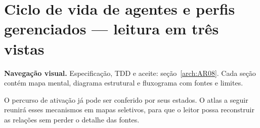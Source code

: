 \clearpage\section{Ciclo de vida de agentes e perfis gerenciados — leitura em três vistas}\label{arch:AR05}




\begin{descricao}\textbf{Navegação visual.} Especificação, TDD e aceite: seção~\ref{arch:AR08}. Cada seção contém mapa mental, diagrama estrutural e fluxograma com fontes e limites.\end{descricao}


O percurso de ativação já pode ser conferido por seus estados. O atlas a seguir reunirá esses mecanismos em mapas seletivos, para que o leitor possa reconstruir as relações sem perder o detalhe das fontes.
